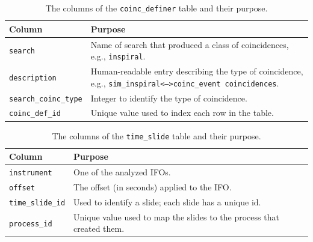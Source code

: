 \begin{table}[p]
\label{tab:coinc_definer}
\center
\begin{tabular}{l | p{10cm}}
Column      &   Purpose     \\
\hline \hline
\texttt{search}     &       Name of search that produced a class of coincidences, e.g., \texttt{inspiral}. \\
\hline
\texttt{description}    &   Human-readable entry describing the type of coincidence, e.g., \texttt{sim\_inspiral<-->coinc\_event coincidences}. \\
\hline
\texttt{search\_coinc\_type}    &   Integer to identify the type of coincidence. \\
\hline
\texttt{coinc\_def\_id}     &   Unique value used to index each row in the table.
\end{tabular}
\caption{The columns of the \texttt{coinc\_definer} table and their purpose.}
\end{table}

\pagebreak

\begin{table}[p]
\label{tab:time_slide}
\center
\begin{tabular}{m{3.5cm} | p{10cm}}
Column      &   Purpose     \\
\hline \hline
\texttt{instrument} &   One of the analyzed \acp{IFO}. \\
\hline
\texttt{offset}     &   The offset (in seconds) applied to the \ac{IFO}. \\
\hline
\texttt{time\_slide\_id}    &   Used to identify a slide; each slide has a unique id. \\
\hline
\texttt{process\_id}    &   Unique value used to map the slides to the process that created them.
\end{tabular}
\caption{The columns of the \texttt{time\_slide} table and their purpose.}
\end{table}

